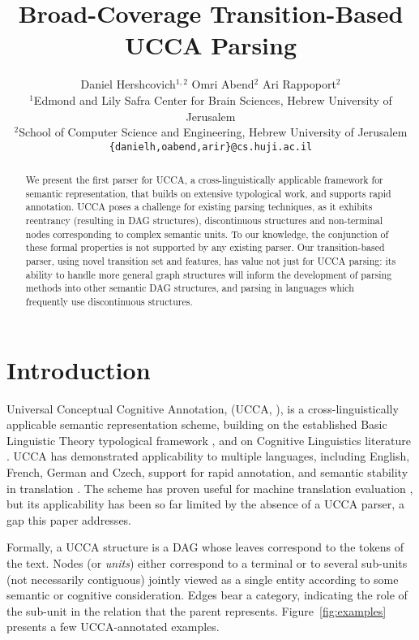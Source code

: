 \documentclass[11pt]{article}
\title{Broad-Coverage Transition-Based UCCA Parsing}
\author{Daniel Hershcovich$^{1,2}$ \And Omri Abend$^2$ \And Ari Rappoport$^2$ \\
  $^1$Edmond and Lily Safra Center for Brain Sciences, Hebrew University of Jerusalem \\
  $^2$School of Computer Science and Engineering, Hebrew University of Jerusalem \\
  \texttt{\{danielh,oabend,arir\}@cs.huji.ac.il}
}
\date{}
\newcommand{\figref}[1]{Figure~\ref{#1}}
\begin{document}
\maketitle

\begin{abstract}
  We present the first parser for UCCA, a
  cross-linguistically applicable framework for semantic
  representation, that builds on extensive
  typological work, and supports rapid annotation.
  UCCA poses a challenge for existing parsing techniques,
  as it exhibits reentrancy (resulting in DAG structures),
  discontinuous structures and non-terminal nodes corresponding
  to complex semantic units. To our knowledge, the conjunction
  of these formal properties is not supported by any existing parser.
  Our transition-based parser, using novel transition set
  and features, has value not just for UCCA parsing:
  its ability to handle more general graph structures will inform
  the development of parsing methods into other semantic DAG structures, 
  and parsing in languages which frequently use discontinuous structures.
\end{abstract}


\section{Introduction}\label{sec:introduction}

Universal Conceptual Cognitive Annotation, (UCCA, ),
is a cross-linguistically applicable semantic representation scheme,
building on the established Basic Linguistic Theory typological framework
\cite{Dixon:10b,Dixon:10a,Dixon:12}, and on Cognitive
Linguistics literature \cite{croft2004cognitive}.
UCCA has demonstrated applicability to multiple languages, including
English, French, German and Czech, support for rapid annotation,
and semantic stability in translation \cite{sulem2015conceptual}.
The scheme has proven useful for machine translation evaluation \cite{birch2016hume},
but its applicability has been so far limited by the absence of a UCCA parser,
a gap this paper addresses.

Formally, a UCCA structure is a DAG whose leaves correspond to the tokens of
the text. Nodes (or {\it units}) either correspond to a terminal or
to several sub-units (not necessarily contiguous) jointly viewed as a
single entity according to some semantic or cognitive consideration.
Edges bear a category, indicating the role of the sub-unit in the relation
that the parent represents. \figref{fig:examples} presents a few UCCA-annotated examples.
\end{document}
